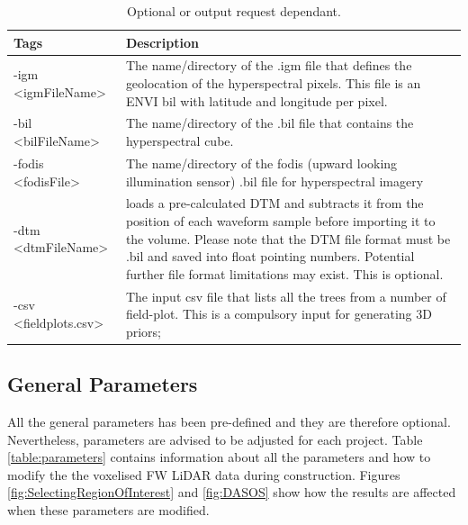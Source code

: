 \documentclass{article}
\begin{document}
	
	\begin{table}
		\centering
		\begin{tabular}{|p{3.4cm}|p{10.7cm}|}
			\toprule
			\textbf{Tags}  & \textbf{Description}  \\
			\midrule
			-igm <igmFileName>  &  The name/directory of the .igm file that defines the geolocation of the hyperspectral pixels.  This file is an ENVI bil with latitude and longitude per pixel.\\
							\cmidrule(r){1-1}\cmidrule(l){2-2}
			-bil <bilFileName>  &  The name/directory of the .bil file that contains the hyperspectral cube.\\
							\cmidrule(r){1-1}\cmidrule(l){2-2}
			-fodis <fodisFile>   & The name/directory of the fodis (upward looking illumination sensor) .bil file for hyperspectral imagery \\
			\midrule
			\midrule
			-dtm <dtmFileName> & loads a pre-calculated DTM and subtracts it from the position of each waveform sample before importing it to the volume. Please note that the DTM file format must be .bil and saved into float pointing numbers. Potential further file format limitations may exist. This is optional. \\
			\midrule
			\midrule
			-csv <fieldplots.csv>  &  The input csv file that lists all the trees from a number of field-plot. This is a compulsory input for generating 3D priors;
				\\
			\bottomrule
		\end{tabular}
		\caption{Optional or output request dependant.}
		\label{table:DASOS_optional_inputs}
	\end{table}
		
			
			\newpage
		\subsection{General Parameters}\label{parameters}
			\par All the general parameters has been pre-defined and they are therefore optional. Nevertheless, parameters are advised to be adjusted for each project. Table \ref{table:parameters} contains information about all the parameters and how to modify the the voxelised FW LiDAR data during construction. Figures \ref{fig:SelectingRegionOfInterest} and \ref{fig:DASOS} show how the results are affected when these parameters are modified.
			
\end{document}
